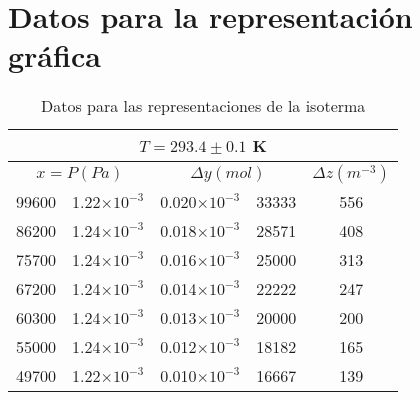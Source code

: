 \documentclass[a4paper,12pt]{article}
\begin{document}
\section{Datos para la representación gráfica}
\begin{table}[H]
  \centering
  \caption{Datos para las representaciones de la isoterma}
  \begin{tabular}{|ccccc|}
    \hline
    \multicolumn{5}{|c|}{$T = 293.4 \pm 0.1$ K}                                                                                                     \\ \hline
    \multicolumn{2}{|c|}{$x = P (Pa)$}                          & \multicolumn{2}{c|}{$\Delta y (mol)$}                     & $\Delta z (m^{-3})$ \\ \hline
    \multicolumn{1}{|c|}{99600} & \multicolumn{1}{c|}{1.22$\times 10^{-3}$} & \multicolumn{1}{c|}{0.020$\times 10^{-3}$} & \multicolumn{1}{c|}{33333} & 556                 \\ \hline
    \multicolumn{1}{|c|}{86200} & \multicolumn{1}{c|}{1.24$\times 10^{-3}$} & \multicolumn{1}{c|}{0.018$\times 10^{-3}$} & \multicolumn{1}{c|}{28571} & 408                 \\ \hline
    \multicolumn{1}{|c|}{75700} & \multicolumn{1}{c|}{1.24$\times 10^{-3}$} & \multicolumn{1}{c|}{0.016$\times 10^{-3}$} & \multicolumn{1}{c|}{25000} & 313                 \\ \hline
    \multicolumn{1}{|c|}{67200} & \multicolumn{1}{c|}{1.24$\times 10^{-3}$} & \multicolumn{1}{c|}{0.014$\times 10^{-3}$} & \multicolumn{1}{c|}{22222} & 247                 \\ \hline
    \multicolumn{1}{|c|}{60300} & \multicolumn{1}{c|}{1.24$\times 10^{-3}$} & \multicolumn{1}{c|}{0.013$\times 10^{-3}$} & \multicolumn{1}{c|}{20000} & 200                 \\ \hline
    \multicolumn{1}{|c|}{55000} & \multicolumn{1}{c|}{1.24$\times 10^{-3}$} & \multicolumn{1}{c|}{0.012$\times 10^{-3}$} & \multicolumn{1}{c|}{18182} & 165                 \\ \hline
    \multicolumn{1}{|c|}{49700} & \multicolumn{1}{c|}{1.22$\times 10^{-3}$} & \multicolumn{1}{c|}{0.010$\times 10^{-3}$} & \multicolumn{1}{c|}{16667} & 139                 \\ \hline
  \end{tabular}
\end{table}
\end{document}
